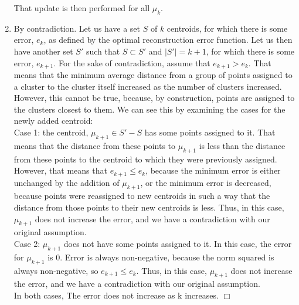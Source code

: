 \documentclass[12pt]{article}
\begin{document}
\begin{enumerate}[label=(\alph*)]
  That update is then performed for all $\mu_k$.
  \item By contradiction. Let us have a set $S$ of $k$ centroids, for which there is some error, $e_k$, as defined by the optimal reconstruction error function. Let us then have another set $S'$ such that $S \subset S'$ and $|S'| = k+1$, for which there is some error, $e_{k+1}$. For the sake of contradiction, assume that $e_{k+1} > e_k$. That means that the minimum average distance from a group of points assigned to a cluster to the cluster itself increased as the number of clusters increased. However, this cannot be true, because, by construction, points are assigned to the clusters closest to them. We can see this by examining the cases for the newly added centroid:\\
  Case 1: the centroid, $\mu_{k+1} \in S'-S$ has some points assigned to it. That means that the distance from these points to $\mu_{k+1}$ is less than the distance from these points to the centroid to which they were previously assigned. However, that means that $e_{k+1} \le e_k$, because the minimum error is either unchanged by the addition of $\mu_{k+1}$, or the minimum error is decreased, because points were reassigned to new centroids in such a way that the distance from those points to their new centroids is less. Thus, in this case, $\mu_{k+1}$ does not increase the error, and we have a contradiction with our original assumption.\\
  Case 2: $\mu_{k+1}$ does not have some points assigned to it. In this case, the error for $\mu_{k+1}$ is 0. Error is always non-negative, because the norm squared is always non-negative, so $e_{k+1} \le e_k$. Thus, in this case, $\mu_{k+1}$ does not increase the error, and we have a contradiction with our original assumption.\\
  In both cases, The error does not increase as k increases. $\Box$
\end{enumerate}
\end{document}
